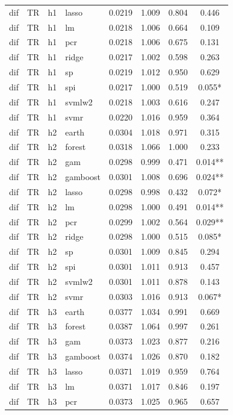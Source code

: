 \begin{ThreePartTable}
\begin{longtable}[t]{llclcccc}
dif & TR & h1 & lasso & 0.0219 & 1.009 & 0.804 & 0.446\\
dif & TR & h1 & lm & 0.0218 & 1.006 & 0.664 & 0.109\\
dif & TR & h1 & pcr & 0.0218 & 1.006 & 0.675 & 0.131\\
dif & TR & h1 & ridge & 0.0217 & 1.002 & 0.598 & 0.263\\
dif & TR & h1 & sp & 0.0219 & 1.012 & 0.950 & 0.629\\
dif & TR & h1 & spi & 0.0217 & 1.000 & 0.519 & 0.055*\\
dif & TR & h1 & svmlw2 & 0.0218 & 1.003 & 0.616 & 0.247\\
dif & TR & h1 & svmr & 0.0220 & 1.016 & 0.959 & 0.364\\
\addlinespace
dif & TR & h2 & earth & 0.0304 & 1.018 & 0.971 & 0.315\\
dif & TR & h2 & forest & 0.0318 & 1.066 & 1.000 & 0.233\\
dif & TR & h2 & gam & 0.0298 & 0.999 & 0.471 & 0.014**\\
dif & TR & h2 & gamboost & 0.0301 & 1.008 & 0.696 & 0.024**\\
dif & TR & h2 & lasso & 0.0298 & 0.998 & 0.432 & 0.072*\\
dif & TR & h2 & lm & 0.0298 & 1.000 & 0.491 & 0.014**\\
dif & TR & h2 & pcr & 0.0299 & 1.002 & 0.564 & 0.029**\\
dif & TR & h2 & ridge & 0.0298 & 1.000 & 0.515 & 0.085*\\
dif & TR & h2 & sp & 0.0301 & 1.009 & 0.845 & 0.294\\
dif & TR & h2 & spi & 0.0301 & 1.011 & 0.913 & 0.457\\
dif & TR & h2 & svmlw2 & 0.0301 & 1.011 & 0.878 & 0.143\\
dif & TR & h2 & svmr & 0.0303 & 1.016 & 0.913 & 0.067*\\
\addlinespace
dif & TR & h3 & earth & 0.0377 & 1.034 & 0.991 & 0.669\\
dif & TR & h3 & forest & 0.0387 & 1.064 & 0.997 & 0.261\\
dif & TR & h3 & gam & 0.0373 & 1.023 & 0.877 & 0.216\\
dif & TR & h3 & gamboost & 0.0374 & 1.026 & 0.870 & 0.182\\
dif & TR & h3 & lasso & 0.0371 & 1.019 & 0.959 & 0.764\\
dif & TR & h3 & lm & 0.0371 & 1.017 & 0.846 & 0.197\\
dif & TR & h3 & pcr & 0.0373 & 1.025 & 0.965 & 0.657\\

\end{longtable}
\end{ThreePartTable}
